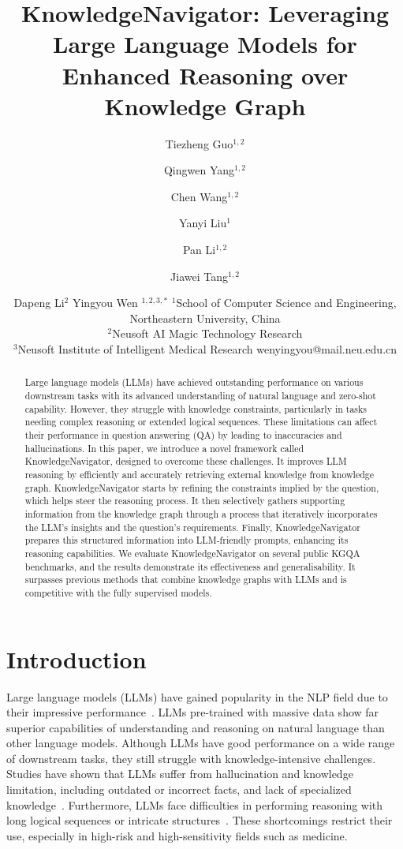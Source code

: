 \documentclass{article}
\title{KnowledgeNavigator: Leveraging Large Language Models for Enhanced Reasoning over Knowledge Graph}
\author{
Tiezheng Guo$^{1,2}$\and
Qingwen Yang$^{1,2}$\and
Chen Wang$^{1,2}$\and
Yanyi Liu$^{1}$ \and
Pan Li$^{1,2}$ \and
Jiawei Tang$^{1,2}$ \and
Dapeng Li$^2$ \And
Yingyou Wen $^{1,2,3,*}$
\affiliations
$^1$School of Computer Science and Engineering, Northeastern University, China\\
$^2$Neusoft AI Magic Technology Research\\
$^3$Neusoft Institute of Intelligent Medical Research
\emails
wenyingyou@mail.neu.edu.cn 
}
\begin{document}
\maketitle

\begin{abstract}
    Large language models (LLMs) have achieved outstanding performance on various downstream tasks with its advanced understanding of natural language and zero-shot capability. However, they struggle with knowledge constraints, particularly in tasks needing complex reasoning or extended logical sequences. These limitations can affect their performance in question answering (QA) by leading to inaccuracies and hallucinations. In this paper, we introduce a novel framework called KnowledgeNavigator, designed to overcome these challenges. It improves LLM reasoning by efficiently and accurately retrieving external knowledge from knowledge graph. KnowledgeNavigator starts by refining the constraints implied by the question, which helps steer the reasoning process. It then selectively gathers supporting information from the knowledge graph through a process that iteratively incorporates the LLM's insights and the question's requirements. Finally, KnowledgeNavigator prepares this structured information into LLM-friendly prompts, enhancing its reasoning capabilities. We evaluate KnowledgeNavigator on several public KGQA benchmarks, and the results demonstrate its effectiveness and generalisability. It surpasses previous methods that combine knowledge graphs with LLMs and is competitive with the fully supervised models.
\end{abstract}

\section{Introduction}



Large language models (LLMs) have gained popularity in the NLP field due to their impressive performance~\cite{touvron2023llama,anil2023palm,bai2023qwen}. LLMs pre-trained with massive data show far superior capabilities of understanding and reasoning on natural language than other language models. Although LLMs have good performance on a wide range of downstream tasks, they still struggle with knowledge-intensive challenges. Studies have shown that LLMs suffer from hallucination and knowledge limitation, including outdated or incorrect facts, and lack of specialized knowledge~\cite{zhang2023siren,martino2023knowledge,chen2023systems}. Furthermore, LLMs face difficulties in performing reasoning with long logical sequences or intricate structures~\cite{creswell2022selection}. These shortcomings restrict their use, especially in high-risk and high-sensitivity fields such as medicine.
\end{document}
